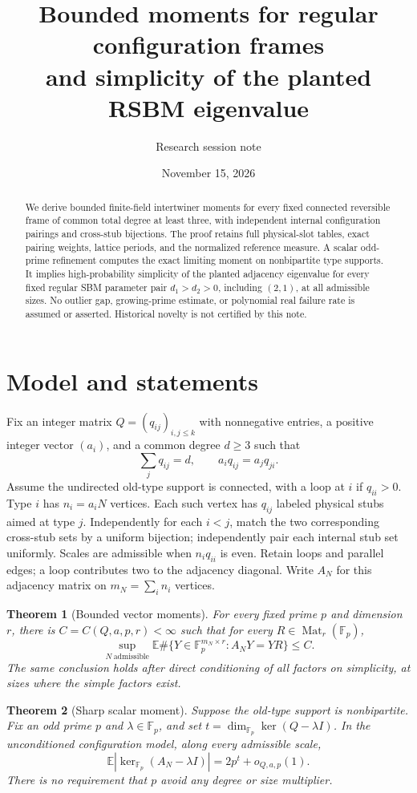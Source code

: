 \documentclass[11pt]{article}
\title{Bounded moments for regular configuration frames\\and simplicity of the planted RSBM eigenvalue}
\author{Research session note}
\date{November 15, 2026}
\newtheorem{theorem}{Theorem}
\newcommand{\Fp}{\mathbb F_p}
\newcommand{\E}{\mathbb E}
\begin{document}
\maketitle
\begin{abstract}
We derive bounded finite-field intertwiner moments for every fixed connected reversible frame of common total degree at least three, with independent internal configuration pairings and cross-stub bijections. The proof retains full physical-slot tables, exact pairing weights, lattice periods, and the normalized reference measure. A scalar odd-prime refinement computes the exact limiting moment on nonbipartite type supports. It implies high-probability simplicity of the planted adjacency eigenvalue for every fixed regular SBM parameter pair $d_1>d_2>0$, including $(2,1)$, at all admissible sizes. No outlier gap, growing-prime estimate, or polynomial real failure rate is assumed or asserted. Historical novelty is not certified by this note.
\end{abstract}

\section{Model and statements}
Fix an integer matrix $Q=(q_{ij})_{i,j\le k}$ with nonnegative entries, a positive integer vector $(a_i)$, and a common degree $d\ge3$ such that
\[
 \sum_jq_{ij}=d,\qquad a_iq_{ij}=a_jq_{ji}.
\]
Assume the undirected old-type support is connected, with a loop at $i$ if $q_{ii}>0$. Type $i$ has $n_i=a_iN$ vertices. Each such vertex has $q_{ij}$ labeled physical stubs aimed at type $j$. Independently for each $i<j$, match the two corresponding cross-stub sets by a uniform bijection; independently pair each internal stub set uniformly. Scales are admissible when $n_iq_{ii}$ is even. Retain loops and parallel edges; a loop contributes two to the adjacency diagonal. Write $A_N$ for this adjacency matrix on $m_N=\sum_i n_i$ vertices.

\begin{theorem}[Bounded vector moments]\label{thm:matrix}
For every fixed prime $p$ and dimension $r$, there is $C=C(Q,a,p,r)<\infty$ such that for every $R\in\operatorname{Mat}_r(\Fp)$,
\[
 \sup_{N\ \mathrm{admissible}}
 \E\#\{Y\in\Fp^{m_N\times r}:A_NY=YR\}\le C.
\]
The same conclusion holds after direct conditioning of all factors on simplicity, at sizes where the simple factors exist.
\end{theorem}

\begin{theorem}[Sharp scalar moment]\label{thm:scalar}
Suppose the old-type support is nonbipartite. Fix an odd prime $p$ and $\lambda\in\Fp$, and set $t=\dim_{\Fp}\ker(Q-\lambda I)$. In the unconditioned configuration model, along every admissible scale,
\[
 \E|\ker_{\Fp}(A_N-\lambda I)|=2p^t+o_{Q,a,p}(1).
\]
There is no requirement that $p$ avoid any degree or size multiplier.
\end{theorem}
\end{document}
